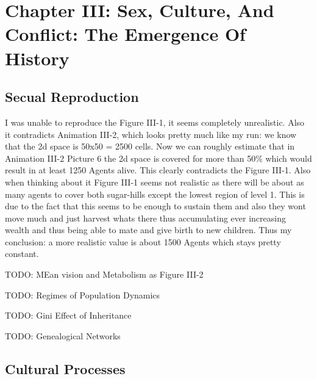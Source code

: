 \section{Chapter III: Sex, Culture, And Conflict: The Emergence Of History}

\subsection{Secual Reproduction}
I was unable to reproduce the Figure III-1, it seems completely unrealistic. Also it contradicts Animation III-2, which looks pretty much like my run: we know that the 2d space is 50x50 = 2500 cells. Now we can roughly estimate that in Animation III-2 Picture 6 the 2d space is covered for more than 50\% which would result in at least 1250 Agents alive. This clearly contradicts the Figure III-1. Also when thinking about it Figure III-1 seems not realistic as there will be about as many agents to cover both sugar-hills except the lowest region of level 1. This is due to the fact that this seems to be enough to sustain them and also they wont move much and just harvest whats there thus accumulating ever increasing wealth and thus being able to mate and give birth to new children. Thus my conclusion: a more realistic value is about 1500 Agents which stays pretty constant.

TODO: MEan vision and Metabolism as Figure III-2

TODO: Regimes of Population Dynamics

TODO: Gini Effect of Inheritance

TODO: Genealogical Networks

\subsection{Cultural Processes}